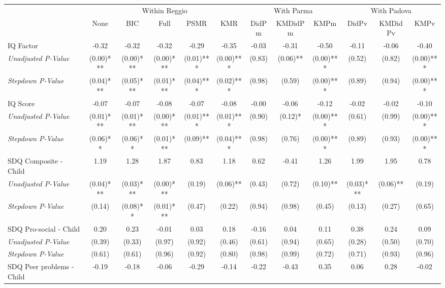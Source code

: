 \begin{tabular}{l c c c c c c c c c c c}
\toprule
& \multicolumn{5}{c}{Within Reggio} & \multicolumn{3}{c}{With Parma} & \multicolumn{3}{c}{With Padova} \\\cmidrule(lr){2-6} \cmidrule(lr){7-9} \cmidrule(lr){10-12}
 & None & BIC & Full & PSMR & KMR & DidPm & KMDidPm & KMPm & DidPv & KMDidPv & KMPv \\
\midrule
IQ Factor & -0.32 & -0.32 & -0.32 & -0.29 & -0.35 & -0.03 & -0.31 & -0.50 & -0.11 & -0.06 & -0.40 \\
\quad \textit{Unadjusted P-Value} & (0.00)*** & (0.00)*** & (0.00)*** & (0.01)*** & (0.00)*** & (0.83) & (0.06)** & (0.00)*** & (0.52) & (0.82) & (0.00)*** \\
\quad \textit{Stepdown P-Value} & (0.04)*** & (0.05)*** & (0.01)*** & (0.04)*** & (0.02)*** & (0.98) & (0.59) & (0.00)*** & (0.89) & (0.94) & (0.00)*** \\
IQ Score & -0.07 & -0.07 & -0.08 & -0.07 & -0.08 & -0.00 & -0.06 & -0.12 & -0.02 & -0.02 & -0.10 \\
\quad \textit{Unadjusted P-Value} & (0.01)*** & (0.01)*** & (0.00)*** & (0.01)*** & (0.01)*** & (0.90) & (0.12)* & (0.00)*** & (0.61) & (0.99) & (0.00)*** \\
\quad \textit{Stepdown P-Value} & (0.06)** & (0.06)** & (0.01)*** & (0.09)** & (0.04)*** & (0.98) & (0.76) & (0.00)*** & (0.89) & (0.93) & (0.00)*** \\
SDQ Composite - Child & 1.19 & 1.28 & 1.87 & 0.83 & 1.18 & 0.62 & -0.41 & 1.26 & 1.99 & 1.95 & 0.78 \\
\quad \textit{Unadjusted P-Value} & (0.04)*** & (0.03)*** & (0.00)*** & (0.19) & (0.06)** & (0.43) & (0.72) & (0.10)** & (0.03)*** & (0.06)** & (0.19) \\
\quad \textit{Stepdown P-Value} & (0.14) & (0.08)** & (0.01)*** & (0.47) & (0.22) & (0.94) & (0.98) & (0.45) & (0.13) & (0.27) & (0.65) \\
SDQ Pro-social - Child & 0.20 & 0.23 & -0.01 & 0.03 & 0.18 & -0.16 & 0.04 & 0.11 & 0.38 & 0.24 & 0.09 \\
\quad \textit{Unadjusted P-Value} & (0.39) & (0.33) & (0.97) & (0.92) & (0.46) & (0.61) & (0.94) & (0.65) & (0.28) & (0.50) & (0.70) \\
\quad \textit{Stepdown P-Value} & (0.61) & (0.61) & (0.96) & (0.92) & (0.80) & (0.98) & (0.99) & (0.72) & (0.71) & (0.93) & (0.96) \\
SDQ Peer problems - Child & -0.19 & -0.18 & -0.06 & -0.29 & -0.14 & -0.22 & -0.43 & 0.35 & 0.06 & 0.28 & -0.02 \\

\end{tabular}
